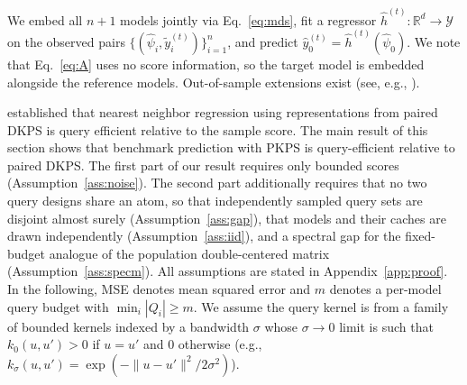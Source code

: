 \documentclass{article}
\theoremstyle{definition}
\theoremstyle{plain}
\newcommand{\PKPS}{PKPS\xspace}
\begin{document}
We embed all $n{+}1$ models jointly via Eq.~\eqref{eq:mds}, fit a regressor $\hat h^{(t)}:\mathbb{R}^{d}\to\mathcal{Y}$ on
the observed pairs $\{(\hat\psi_{i},\tilde{y}_{i}^{(t)})\}_{i=1}^{n}$, and
predict $\hat y^{(t)}_{0}=\hat h^{(t)}(\hat\psi_{0})$.
We note that Eq.~\eqref{eq:A} uses no
score information, so the target model is embedded alongside the reference models.
Out-of-sample extensions exist (see, e.g., \citealp{trosset2008out, 10.3389/fnhum.2022.930291}).

\citet{dkps_qeff} established that nearest neighbor regression using representations
from paired DKPS is query efficient relative to the sample score.
The main result of this section shows that benchmark prediction with \PKPS is
query-efficient relative to paired DKPS.
The first part of our result requires only bounded scores
(Assumption~\ref{ass:noise}). The second part additionally requires that no two
query designs share an atom, so that independently sampled query sets are disjoint
almost surely (Assumption~\ref{ass:gap}), that models and their caches are drawn
independently (Assumption~\ref{ass:iid}), and a spectral gap for the fixed-budget
analogue of the population double-centered matrix (Assumption~\ref{ass:specm}).
All assumptions are stated in Appendix~\ref{app:proof}.
In the following, MSE denotes mean squared error and
$m$ denotes a per-model query budget with $\min_{i}|Q_{i}|\ge m$.
We assume the query kernel is from a family
of bounded kernels indexed by a bandwidth $\sigma$ whose
$\sigma\to0$ limit is such that $ k_{0}(u, u') > 0 $ if $ u = u' $ and $ 0 $
otherwise (e.g., $k_{\sigma}(u,u')=\exp(-\|u-u'\|^{2}/2\sigma^{2})$).
\end{document}
